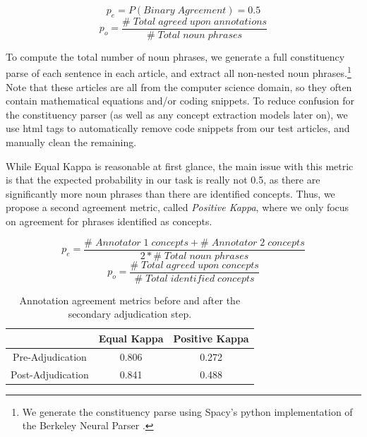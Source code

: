\documentclass[thesis.tex]{subfiles}
\begin{document}
\begin{equation}
p_e = P(Binary\;Agreement) = 0.5
\end{equation}
\begin{equation}
p_o = \frac{\#\;Total\;agreed\;upon\;annotations}{\#\;Total\;noun\;phrases}
\end{equation}

To compute the total number of noun phrases, we generate a full constituency parse of each sentence in each article, and extract all non-nested noun phrases.\footnote{We generate the constituency parse using Spacy's python implementation of the Berkeley Neural Parser \cite{kitaev2018constituency}.} Note that these articles are all from the computer science domain, so they often contain mathematical equations and/or coding snippets. To reduce confusion for the constituency parser (as well as any concept extraction models later on), we use html tags to automatically remove code snippets from our test articles, and manually clean the remaining.

While Equal Kappa is reasonable at first glance, the main issue with this metric is that the expected probability in our task is really not 0.5, as there are significantly more noun phrases than there are identified concepts. Thus, we propose a second agreement metric, called \textit{Positive Kappa}, where we only focus on agreement for phrases identified as concepts.

\begin{equation}
p_e = \frac{\#\;Annotator\;1\;concepts + \#\;Annotator\;2\;concepts}{2 * \#\;Total\;noun\;phrases}
\end{equation}
\begin{equation}
p_o = \frac{\#\;Total\;agreed\;upon\;concepts}{\#\;Total\;identified\;concepts}
\end{equation}

\begin{table}
\begin{center}
\small
\begin{tabular}{|c|c|c|} \hline
& Equal Kappa & Positive Kappa \\ \hline
Pre-Adjudication & 0.806 & 0.272 \\ 
Post-Adjudication & 0.841 & 0.488 \\ \hline
\end{tabular}
\end{center}
\caption{\label{tab:kappa_agreement} Annotation agreement metrics before and after the secondary adjudication step.}
\end{table}
\end{document}
